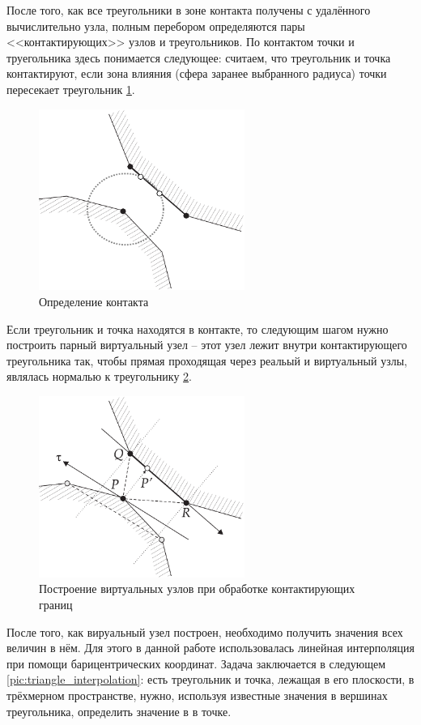 После того, как все треугольники в зоне контакта получены с удалённого вычислительно узла, полным перебором определяются пары <<контактирующих>> узлов и треугольников. По контактом точки и труегольника здесь понимается следующее: считаем, что треугольник и точка контактируют, если зона влияния (сфера заранее выбранного радиуса) точки пересекает треугольник \ref{pic:contact_detection}.
\begin{figure}[htp]
\centering
\includegraphics[width=0.6\textwidth]{pdf/contact_detection.pdf}
\caption{Определение контакта}
\label{pic:contact_detection}
\end{figure}
Если треугольник и точка находятся в контакте, то следующим шагом нужно построить парный виртуальный узел -- этот узел лежит внутри контактирующего треугольника так, чтобы прямая проходящая через реальый и виртуальный узлы, являлась нормалью к треугольнику \ref{pic:contact_processing}.
\begin{figure}[htp]
\centering
\includegraphics[width=0.6\textwidth]{pdf/contact_processing.pdf}
\caption{Построение виртуальных узлов при обработке контактирующих границ}
\label{pic:contact_processing}
\end{figure}
После того, как вируальный узел построен, необходимо получить значения всех величин в нём. Для этого в данной работе использовалась линейная интерполяция при помощи барицентрических координат. Задача заключается в следующем \ref{pic:triangle_interpolation}: есть треугольник и точка, лежащая в его плоскости, в трёхмерном пространстве, нужно, используя известные значения в вершинах треугольника, определить значение в в точке.
